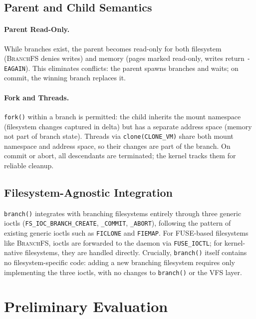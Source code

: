 \documentclass[sigconf]{acmart}
\newcommand{\sys}{\textsc{BranchFS}\xspace}
\newcommand{\syscall}{\texttt{branch()}\xspace}
\begin{document}
\subsection{Parent and Child Semantics}

\paragraph{Parent Read-Only.}
While branches exist, the parent becomes read-only for both filesystem (\sys denies writes) and memory (pages marked read-only, writes return \texttt{-EAGAIN}). This eliminates conflicts: the parent spawns branches and waits; on commit, the winning branch replaces it.

\paragraph{Fork and Threads.}
\texttt{fork()} within a branch is permitted: the child inherits the mount namespace (filesystem changes captured in delta) but has a separate address space (memory not part of branch state). Threads via \texttt{clone(CLONE\_VM)} share both mount namespace and address space, so their changes are part of the branch. On commit or abort, all descendants are terminated; the kernel tracks them for reliable cleanup.

\subsection{Filesystem-Agnostic Integration}

\syscall integrates with branching filesystems entirely through three generic ioctls (\texttt{FS\_IOC\_BRANCH\_CREATE}, \texttt{\_COMMIT}, \texttt{\_ABORT}), following the pattern of existing generic ioctls such as \texttt{FICLONE} and \texttt{FIEMAP}. For FUSE-based filesystems like \sys, ioctls are forwarded to the daemon via \texttt{FUSE\_IOCTL}; for kernel-native filesystems, they are handled directly. Crucially, \syscall itself contains no filesystem-specific code: adding a new branching filesystem requires only implementing the three ioctls, with no changes to \syscall or the VFS layer.

\section{Preliminary Evaluation}
\label{sec:evaluation}
\end{document}
